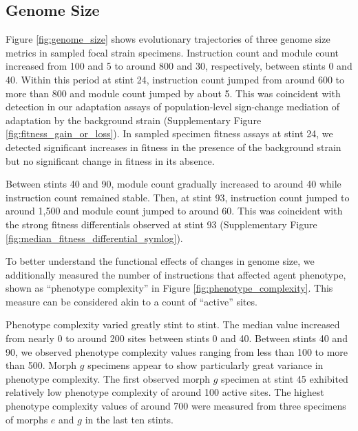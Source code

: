 \subsection{Genome Size}

Figure \ref{fig:genome_size} shows evolutionary trajectories of three genome size metrics in sampled focal strain specimens.
Instruction count and module count increased from 100 and 5 to around 800 and 30, respectively, between stints 0 and 40.
Within this period at stint 24, instruction count jumped from around 600 to more than 800 and module count jumped by about 5.
This was coincident with detection in our adaptation assays of population-level sign-change mediation of adaptation by the background strain (Supplementary Figure \ref{fig:fitness_gain_or_loss}).
In sampled specimen fitness assays at stint 24, we detected significant increases in fitness in the presence of the background strain but no significant change in fitness in its absence.

Between stints 40 and 90, module count gradually increased to around 40 while instruction count remained stable.
Then, at stint 93, instruction count jumped to around 1,500 and module count jumped to around 60.
This was coincident with the strong fitness differentials observed at stint 93 (Supplementary Figure \ref{fig:median_fitness_differential_symlog}).

To better understand the functional effects of changes in genome size, we additionally measured the number of instructions that affected agent phenotype, shown as ``phenotype complexity'' in Figure \ref{fig:phenotype_complexity}.
This measure can be considered akin to a count of ``active'' sites.

Phenotype complexity varied greatly stint to stint.
The median value increased from nearly 0 to around 200 sites between stints 0 and 40.
Between stints 40 and 90, we observed phenotype complexity values ranging from less than 100 to more than 500.
Morph $g$ specimens appear to show particularly great variance in phenotype complexity.
The first observed morph $g$ specimen at stint 45 exhibited relatively low phenotype complexity of around 100 active sites.
The highest phenotype complexity values of around 700 were measured from three specimens of morphs $e$ and $g$ in the last ten stints.
